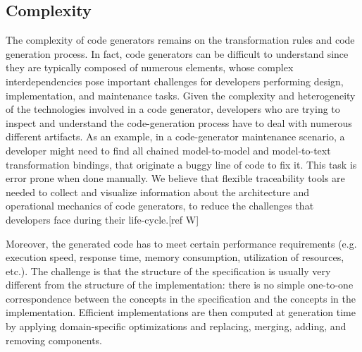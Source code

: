 \subsection{Complexity}
The complexity of code generators remains on the transformation rules and code generation process. In fact, code generators can be difficult to understand since they are typically composed of numerous elements, whose complex interdependencies pose important challenges for developers performing design, implementation, and maintenance tasks. 
Given the complexity and heterogeneity of the technologies involved in a code generator, developers who are trying to inspect and understand the code-generation process have to deal with numerous different artifacts. As an example, in a code-generator maintenance scenario, a developer might need to find all chained model-to-model and model-to-text transformation bindings, that originate a buggy line of code to fix it. This task is error prone when done manually. We believe that flexible traceability tools are needed to collect and visualize information about the architecture and operational mechanics of code generators, to reduce the challenges that developers face during their life-cycle.[ref W]

Moreover, the generated code has to meet certain performance requirements (e.g. execution speed, response time, memory consumption, utilization of resources, etc.). The challenge is that the structure of the specification is usually very different from the structure of the implementation: there is no simple one-to-one correspondence between the concepts in the specification and the concepts in the implementation. 
Efficient implementations are then computed at generation time by applying domain-specific optimizations and replacing, merging, adding, and removing components.

